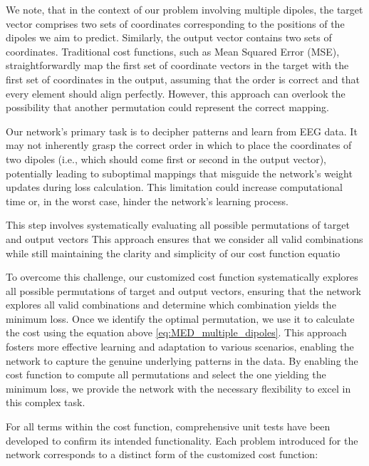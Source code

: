 \documentclass[a4paper, UKenglish, 11pt]{uiomaster}
\begin{document}
We note, that in the context of our problem involving multiple dipoles, the target vector comprises two sets of coordinates corresponding to the positions of the dipoles we aim to predict. Similarly, the output vector contains two sets of coordinates. Traditional cost functions, such as Mean Squared Error (MSE), straightforwardly map the first set of coordinate vectors in the target with the first set of coordinates in the output, assuming that the order is correct and that every element should align perfectly. However, this approach can overlook the possibility that another permutation could represent the correct mapping.

Our network's primary task is to decipher patterns and learn from EEG data. It may not inherently grasp the correct order in which to place the coordinates of two dipoles (i.e., which should come first or second in the output vector), potentially leading to suboptimal mappings that misguide the network's weight updates during loss calculation. This limitation could increase computational time or, in the worst case, hinder the network's learning process.

This step involves systematically evaluating all possible permutations of target and output vectors  This approach ensures that we consider all valid combinations while still maintaining the clarity and simplicity of our cost function equatio

To overcome this challenge, our customized cost function systematically explores all possible permutations of target and output vectors, ensuring that the network explores all valid combinations and determine which combination yields the minimum loss. Once we identify the optimal permutation, we use it to calculate the cost using the equation above \ref{eq:MED_multiple_dipoles}. This approach fosters more effective learning and adaptation to various scenarios, enabling the network to capture the genuine underlying patterns in the data. By enabling the cost function to compute all permutations and select the one yielding the minimum loss, we provide the network with the necessary flexibility to excel in this complex task.

For all terms within the cost function, comprehensive unit tests have been developed to confirm its intended functionality. Each problem introduced for the network corresponds to a distinct form of the customized cost function:
\end{document}
